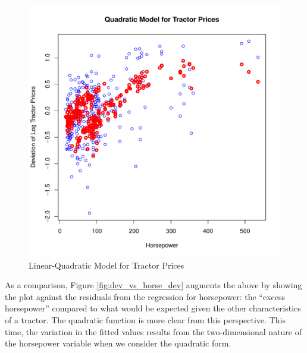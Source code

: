 \documentclass[11pt]{paper}
\begin{document}
\begin{figure}[h!]
  \centering
  \includegraphics[scale = 0.5, keepaspectratio=true]{../Figures/dev_vs_horse}
  \caption{Linear-Quadratic Model for Tractor Prices} \label{fig:dev_vs_horse}
\end{figure}



\pagebreak
As a comparison, Figure \ref{fig:dev_vs_horse_dev} 
augments the above by showing the plot against the 
residuals from the regression for horsepower:
the ``excess horsepower'' compared to what would be 
expected given the other characteristics of a tractor. 
The quadratic function is more clear from this perspective. 
This time, the variation in the fitted values results from the 
two-dimensional nature of the horsepower variable
when we consider the quadratic form.
\end{document}
